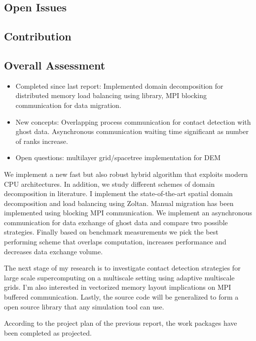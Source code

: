 \documentclass[times,12pt]{article}
\begin{document}
\subsection{Open Issues}

\subsection{Contribution}

\subsection{Overall Assessment}

\vspace{5mm}
\begin{itemize}
\item Completed since last report: Implemented domain decomposition for distributed memory load balancing using library, MPI blocking communication for data migration. 
\item New concepts: Overlapping process communication for contact detection with ghost data. Asynchronous communication waiting
time significant as number of ranks increase.
\item Open questions: multilayer grid/spacetree implementation for DEM 
\end{itemize}

We implement a new fast but also robust hybrid algorithm that exploits modern CPU architectures. In addition, we study different schemes of domain decomposition in literature. I implement the state-of-the-art spatial domain decomposition and load balancing using Zoltan. Manual migration has been implemented using blocking MPI communication. We implement an asynchronous communication for data exchange of ghost data and compare two possible strategies. Finally based on benchmark measurements we pick the best performing scheme that overlaps computation, increases performance and decreases data exchange volume.

The next stage of my research is to investigate contact detection strategies for large scale supercomputing on a multiscale setting using adaptive multiscale grids. I'm also interested in vectorized memory layout implications on MPI buffered communication. Lastly, the source code will be generalized to form a open source library that any simulation tool can use. 

According to the project plan of the previous report, the work packages have been completed as projected.
 
\end{document}
